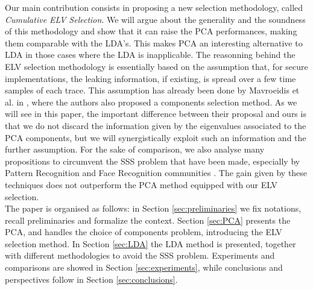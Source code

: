  Our main contribution consists in proposing a new selection methodology, called {\em Cumulative ELV Selection}. We will argue about the generality and the soundness of this methodology and show that it can raise the PCA performances, making them comparable with the LDA's. This makes PCA an interesting alternative to LDA in those cases where the LDA is inapplicable. The reasonning behind the ELV selection methodology is essentially based on the assumption that, for secure implementations, the leaking information, if existing, is spread over a few time samples of each trace. This assumption has already been done by Mavroeidis et al. in \cite{SCAclassProbl}, where the authors  also proposed a components selection method. As we will see in this paper, the important difference between their proposal and ours is that we do not discard the information given by the eigenvalues associated to the PCA components, but we will synergistically exploit such an information and the further assumption. For the sake of comparison, we also analyse many propositions to circumvent the SSS problem that have been made, especially by Pattern Recognition and Face Recognition communities \cite{eigenfaces,Chen2000,huang,Yu01adirect}. The gain given by these techniques does not outperform the PCA method equipped with our ELV selection.\\

The paper is organised as follows: in Section \ref{sec:preliminaries} we fix notations, recall preliminaries and formalize the context. Section \ref{sec:PCA} presents the PCA, and handles the choice of components problem, introducing the  ELV selection method. In Section \ref{sec:LDA} the LDA method is presented, together with different methodologies to avoid the SSS problem. Experiments and comparisons are showed in Section \ref{sec:experiments}, while conclusions and perspectives follow in Section \ref{sec:conclusions}. 
